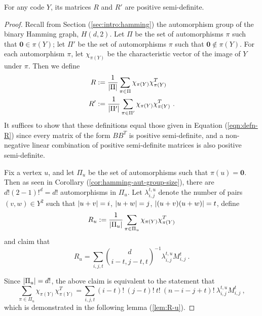 \documentclass{report}
\newcommand{\wt}[1]{\abs{ #1 }}
\newcommand{\vzero}{\mathbf{0}}
\newcommand{\lijtu}{\lambda_{i, j}^{t, u}}
\newcommand{\Mijt}{M_{i, j}^t}
\newcommand{\chipiY}{\chi_{\pi(Y)}}
\begin{document}
    \begin{thm}\label{thm:R-psd}
      For any code $Y$, its matrices $R$ and $R'$ are positive semi-definite.
    \end{thm}

    \begin{proof}

      Recall from Section (\ref{sec:intro:hamming}) the automorphism group of
      the binary Hamming graph, $H(d, 2)$.  Let $\Pi$ be the set of
      automorphisms $\pi$ such that $\vzero \in \pi(Y)$; let $\Pi'$ be the set of
      automorphisms $\pi$ such that $\vzero \not\in \pi(Y)$.  For each
      automorphism $\pi$, let $\chipiY$ be the characteristic vector of the
      image of $Y$ under $\pi$.  Then we define
      \begin{equation}\label{eqn:alt-defn-R} \begin{aligned}
        R  &:= \frac{1}{\abs{\Pi}} \sum_{\pi \in \Pi} \chipiY \chipiY^T \\
        R' &:= \frac{1}{\abs{\Pi'}} \sum_{\pi \in \Pi'} \chipiY \chipiY^T \ .
      \end{aligned} \end{equation}
      It suffices to show that these definitions equal those given in Equation
      (\ref{eqn:defn-R}) since every matrix of the form $BB^T$ is positive
      semi-definite, and a non-negative linear combination of positive
      semi-definite matrices is also positive semi-definite.

      Fix a vertex $u$, and let $\Pi_u$ be the set of automorphisms such that
      $\pi(u) = \vzero$.  Then as seen in Corollary
      (\ref{cor:hamming-aut-group-size}), there are $d! (2-1)!^d = d!$
      automorphisms in $\Pi_u$.  Let $\lijtu$ denote the number of pairs $(v, w)
      \in Y^2$ such that $\wt{u + v} = i$, $\wt{u + w} = j$, $\wt{(u+v)(u+w)} =
      t$, define
      $$
        R_u := \frac{1}{\abs{\Pi_u}} \sum_{\pi \in \Pi_u} \chipiY \chipiY^T
      $$
      and claim that
      \begin{equation}\label{eqn:R-u}
        R_u = \sum_{i, j, t} \binom{d}{i-t, j-t, t}^{-1} \lijtu \Mijt \ .
      \end{equation}

      Since $\left\lvert \Pi_u \right\rvert = d!$, the above claim is equivalent to the statement
      that
      $$
        \sum_{\pi \in \Pi_u} \chipiY \chipiY^T =
        \sum_{i, j, t} (i-t)!\ (j-t)!\ t!\ (n-i-j+t)!\ \lijtu \Mijt \ ,
      $$
      which is demonstrated in the following lemma (\ref{lem:R-u}).


\end{proof}
\end{document}
